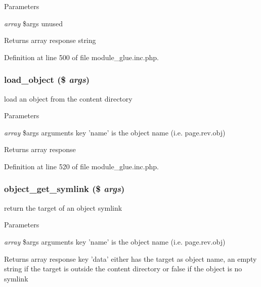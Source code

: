 \begin{DoxyParams}{Parameters}
\item[{\em array}]\$args unused \end{DoxyParams}
\begin{DoxyReturn}{Returns}
array response string 
\end{DoxyReturn}


Definition at line 500 of file module\_\-glue.inc.php.

\hypertarget{module__glue_8inc_8php_ac6b5ed5ff055ccb4d07ad17cf78d5a11}{
\subsubsection[{load\_\-object}]{\setlength{\rightskip}{0pt plus 5cm}load\_\-object (\$ {\em args})}}
\label{module__glue_8inc_8php_ac6b5ed5ff055ccb4d07ad17cf78d5a11}
load an object from the content directory


\begin{DoxyParams}{Parameters}
\item[{\em array}]\$args arguments key 'name' is the object name (i.e. page.rev.obj) \end{DoxyParams}
\begin{DoxyReturn}{Returns}
array response 
\end{DoxyReturn}


Definition at line 520 of file module\_\-glue.inc.php.

\hypertarget{module__glue_8inc_8php_aa9618d306b7ee5bd9e5d6a0be268ed44}{
\subsubsection[{object\_\-get\_\-symlink}]{\setlength{\rightskip}{0pt plus 5cm}object\_\-get\_\-symlink (\$ {\em args})}}
\label{module__glue_8inc_8php_aa9618d306b7ee5bd9e5d6a0be268ed44}
return the target of an object symlink


\begin{DoxyParams}{Parameters}
\item[{\em array}]\$args arguments key 'name' is the object name (i.e. page.rev.obj) \end{DoxyParams}
\begin{DoxyReturn}{Returns}
array response key 'data' either has the target as object name, an empty string if the target is outside the content directory or false if the object is no symlink 
\end{DoxyReturn}


